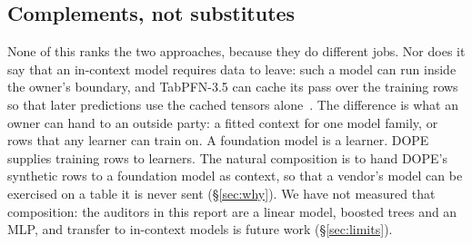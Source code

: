 \documentclass[10pt,letterpaper,twocolumn]{article}
\begin{document}
\subsection{Complements, not substitutes}
None of this ranks the two approaches, because they do different jobs. Nor does it say that an in-context model requires data to leave: such a model can run inside the owner's boundary, and TabPFN-3.5 can cache its pass over the training rows so that later predictions use the cached tensors alone~\cite{tabpfn35}. The difference is what an owner can hand to an outside party: a fitted context for one model family, or rows that any learner can train on. A foundation model is a learner. DOPE supplies training rows to learners. The natural composition is to hand DOPE's synthetic rows to a foundation model as context, so that a vendor's model can be exercised on a table it is never sent (\S\ref{sec:why}). We have not measured that composition: the auditors in this report are a linear model, boosted trees and an MLP, and transfer to in-context models is future work (\S\ref{sec:limits}).
\end{document}
